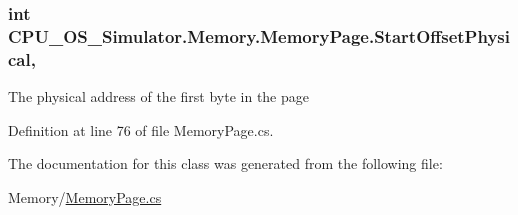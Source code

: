 \subsubsection[{Start\+Offset\+Physical}]{\setlength{\rightskip}{0pt plus 5cm}int C\+P\+U\+\_\+\+O\+S\+\_\+\+Simulator.\+Memory.\+Memory\+Page.\+Start\+Offset\+Physical\hspace{0.3cm}{\ttfamily [get]}, {\ttfamily [set]}}\label{class_c_p_u___o_s___simulator_1_1_memory_1_1_memory_page_af31a2243a3e68ec635315929859fa358}


The physical address of the first byte in the page 



Definition at line 76 of file Memory\+Page.\+cs.



The documentation for this class was generated from the following file\+:\begin{DoxyCompactItemize}
\item 
Memory/\hyperlink{_memory_page_8cs}{Memory\+Page.\+cs}\end{DoxyCompactItemize}
